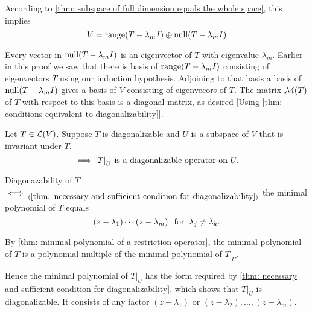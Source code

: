 \begin{prf}
  According to \ref{thm: subspace of full dimension equals the whole space}, this implies
  \begin{equation}
    V=\operatorname{range}(T-\lambda_m I) \oplus \operatorname{null} (T-\lambda_m I)
  \end{equation}

  Every vector in $\operatorname{null} (T-\lambda_m I)$ is an eigenvector of $T$ with eigenvalue $\lambda_m$. Earlier in this proof we saw that there is basis of $\operatorname{range}(T-\lambda_mI)$ consisting of eigenvectors $T$ using our induction hypothesis. Adjoining to that basis a basis of $\operatorname{null}(T-\lambda_mI)$ gives a basis of $V$ consisting of eigenvecors of $T$. The matrix $\mathcal{M}(T)$ of $T$ with respect to this basis is a diagonal matrix, as desired [Using \ref{thm: conditions equivalent to diagonalizability}].
\end{prf}

\setcounter{thm}{64}
\begin{thm}
  \label{thm: restriction of diagonalizable operator to invariant subspace}
  Let $T\in \mathcal{L}(V)$. Suppose $T$ is diagonalizable and $U$ is a subspace of $V$ that is invariant under $T$.
  \begin{equation}
    \implies$ $\left.T\right|_U$ is a diagonalizable operator on $U.
  \end{equation}
\end{thm}
\begin{prf}
  Diagonazability of $T$ $\iff_{(\ref{thm: necessary and sufficient condition for diagonalizability})}$ the minimal polynomial of $T$ equals
  \begin{equation}
    (z-\lambda_1)\cdots(z-\lambda_m) \;\;\, \text{for}\;\; \lambda_j \neq  \lambda_k.
  \end{equation}

  By \ref{thm: minimal polynomial of a restriction operator}, the minimal polynomial of $T$ is a polynomial multiple of the minimal polynomial of $\left.T\right|_U$.

  Hence the minimal polynomial of $\left.T\right|_U$  has the form required by \ref{thm: necessary and sufficient condition for diagonalizability}, which shows that $\left.T\right|_U$ is diagonalizable. It consists of any factor $(z-\lambda_1)$ or $(z-\lambda_2), \dots, (z-\lambda_m)$.
\end{prf}

